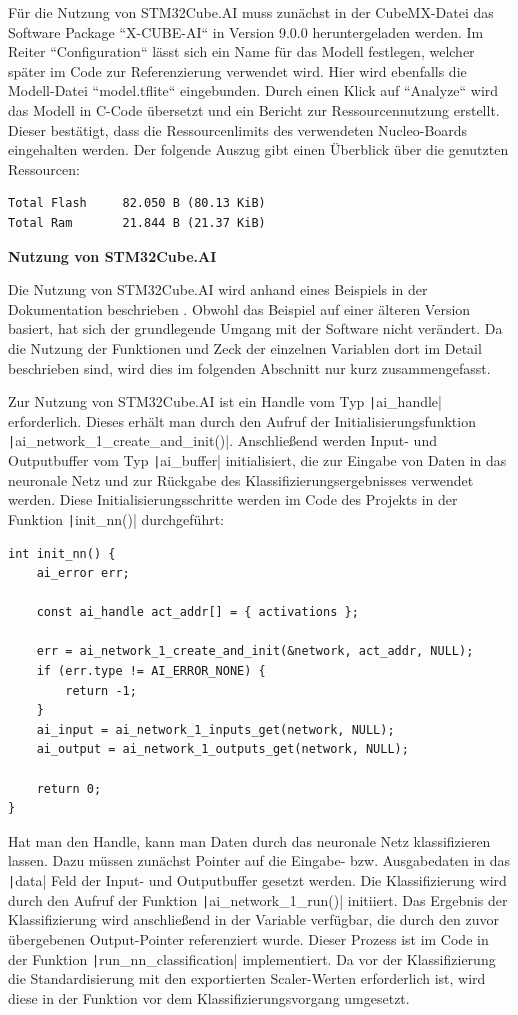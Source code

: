 Für die Nutzung von STM32Cube.AI muss zunächst in der CubeMX-Datei das Software Package ``X-CUBE-AI`` in Version 9.0.0 heruntergeladen werden. Im Reiter ``Configuration`` lässt sich ein Name für das Modell festlegen, welcher später im Code zur Referenzierung verwendet wird. Hier wird ebenfalls die Modell-Datei ``model.tflite`` eingebunden. Durch einen Klick auf ``Analyze`` wird das Modell in C-Code übersetzt und ein Bericht zur Ressourcennutzung erstellt. Dieser bestätigt, dass die Ressourcenlimits des verwendeten Nucleo-Boards eingehalten werden. Der folgende Auszug gibt einen Überblick über die genutzten Ressourcen:

\begin{verbatim}
Total Flash		82.050 B (80.13 KiB)
Total Ram  		21.844 B (21.37 KiB)
\end{verbatim}

\textbf{Nutzung von STM32Cube.AI}

Die Nutzung von STM32Cube.AI wird anhand eines Beispiels in der Dokumentation beschrieben \cite{stm32-cube-ai-documentation}. Obwohl das Beispiel auf einer älteren Version basiert, hat sich der grundlegende Umgang mit der Software nicht verändert. Da die Nutzung der Funktionen und Zeck der einzelnen Variablen dort im Detail  beschrieben sind, wird dies im folgenden Abschnitt nur kurz zusammengefasst.

Zur Nutzung von STM32Cube.AI ist ein Handle vom Typ \texttt|ai_handle| erforderlich. Dieses erhält man durch den Aufruf der Initialisierungsfunktion \texttt|ai_network_1_create_and_init()|. Anschließend werden Input- und Outputbuffer vom Typ \texttt|ai_buffer| initialisiert, die zur Eingabe von Daten in das neuronale Netz und zur Rückgabe des Klassifizierungsergebnisses verwendet werden. Diese Initialisierungsschritte werden im Code des Projekts in der Funktion \texttt|init_nn()| durchgeführt:

\begin{verbatim}
int init_nn() {
	ai_error err;

	const ai_handle act_addr[] = { activations };

	err = ai_network_1_create_and_init(&network, act_addr, NULL);
	if (err.type != AI_ERROR_NONE) {
		return -1;
	}
	ai_input = ai_network_1_inputs_get(network, NULL);
	ai_output = ai_network_1_outputs_get(network, NULL);

	return 0;
}
\end{verbatim}

Hat man den Handle, kann man Daten durch das neuronale Netz klassifizieren lassen. Dazu müssen zunächst Pointer auf die Eingabe- bzw. Ausgabedaten in das \texttt|data| Feld der Input- und Outputbuffer gesetzt werden. Die Klassifizierung wird durch den Aufruf der Funktion \texttt|ai_network_1_run()| initiiert. Das Ergebnis der Klassifizierung wird anschließend in der Variable verfügbar, die durch den zuvor übergebenen Output-Pointer referenziert wurde. Dieser Prozess ist im Code in der Funktion \texttt|run_nn_classification| implementiert. Da vor der Klassifizierung die Standardisierung mit den exportierten Scaler-Werten erforderlich ist, wird diese in der Funktion vor dem Klassifizierungsvorgang umgesetzt.

